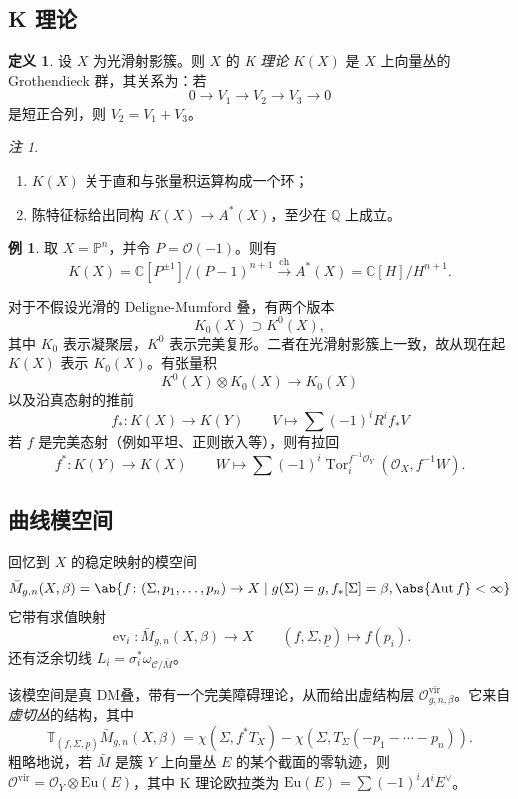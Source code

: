 \documentclass{amsart}
\theoremstyle{definition}
\newtheorem{defn}[thm]{定义}
\newtheorem{exm}[thm]{例}
\theoremstyle{remark}
\newtheorem{rmk}[thm]{注}
\theoremstyle{plain}
\theoremstyle{definition}
\theoremstyle{remark}
\newcommand{\C}{\mathbb{C}}
\newcommand{\Q}{\mathbb{Q}}
\renewcommand{\P}{\mathbb{P}}
\newcommand{\mc}[1]{\mathcal{#1}}
\newcommand{\mr}[1]{\mathrm{#1}}
\newcommand{\on}[1]{\operatorname{#1}}
\newcommand{\ul}[1]{\underline{#1}}
\newcommand{\1}{\mathbf{1}}
\newcommand{\2}{\mathbf{2}}
\newcommand{\3}{\mathbf{3}}
\newcommand{\vir}{\mr{vir}}
\DeclareMathOperator{\Aut}{Aut}
\DeclareMathOperator{\ev}{ev}
\begin{document}
\subsection{K 理论}%
\label{sub:K-theory}

\begin{defn}
    设 \(X\) 为光滑射影簇。则 \(X\) 的 \textit{K 理论} \(K(X)\) 是 \(X\) 上向量丛的 Grothendieck 群，其关系为：若
    \[ 0 \to V_1 \to V_2 \to V_3 \to 0 \]
    是短正合列，则 \(V_2 = V_1 + V_3\)。
\end{defn}

\begin{rmk}\leavevmode
    \begin{enumerate}
        \item \(K(X)\) 关于直和与张量积运算构成一个环；
        \item 陈特征标给出同构 \(K(X) \to A^*(X)\)，至少在 \(\Q\) 上成立。
    \end{enumerate}
\end{rmk}

\begin{exm}
    取 \(X = \P^n\)，并令 \(P = \mc{O}(-1)\)。则有
    \[ K(X) = \C[P^{\pm 1}]/(P-1)^{n+1} \xrightarrow{\on{ch}} A^*(X) = \C[H]/H^{n+1}. \]
\end{exm}

对于不假设光滑的 Deligne-Mumford 叠，有两个版本
\[ K_0(X) \supset K^0(X), \]
其中 \(K_0\) 表示凝聚层，\(K^0\) 表示完美复形。二者在光滑射影簇上一致，故从现在起 \(K(X)\) 表示 \(K_0(X)\)。有张量积
\[ K^0(X) \otimes K_0(X) \to K_0(X) \]
以及沿真态射的推前
\[ f_* \colon K(X) \to K(Y) \qquad V \mapsto \sum (-1)^i R^i f_* V \]
若 \(f\) 是完美态射（例如平坦、正则嵌入等），则有拉回
\[ f^* \colon K(Y) \to K(X) \qquad W \mapsto \sum (-1)^i \on{Tor}_i^{f^{-1} \mc{O}_Y} (\mc{O}_X, f^{-1} W). \]

\subsection{曲线模空间}%
\label{sub:Moduli of curves}

回忆到 \(X\) 的稳定映射的模空间
\[ \bar{M}_{g,n}(X, \beta) = \ab\{ f \colon (\Sigma, p_1, \ldots, p_n) \to X \mid g(\Sigma) = g, f_*[\Sigma] = \beta, \abs{\Aut f} < \infty \} \]
它带有求值映射
\[ \ev_i \colon \bar{M}_{g,n}(X, \beta) \to X \qquad (f, \Sigma, \ul{p}) \mapsto f(p_i). \]
还有泛余切线 \(L_i = \sigma_i^* \omega_{ \mc{C}/\bar{M} }\)。

该模空间是真 DM叠，带有一个完美障碍理论，从而给出虚结构层 \(\mc{O}^{\vir}_{g,n,\beta}\)。它来自\textit{虚切丛}的结构，其中
\[ \mathbb{T}_{(f, \Sigma, \ul{p})} \bar{M}_{g,n}(X, \beta) = \chi(\Sigma, f^* T_X) - \chi(\Sigma, T_{\Sigma}(-p_1 - \cdots - p_n)). \]
粗略地说，若 \(\bar{M}\) 是簇 \(Y\) 上向量丛 \(E\) 的某个截面的零轨迹，则 \(\mc{O}^{\vir} = \mc{O}_Y \otimes \mr{Eu}(E)\)，其中 K 理论欧拉类为 \(\mr{Eu}(E) = \sum (-1)^i \Lambda^i E^{\vee}\)。
\end{document}
